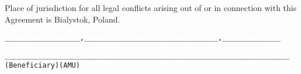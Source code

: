 \A Place of jurisdiction for all legal conflicts arising out of or in
connection with this Agreement is Bialystok, Poland.\\

\vspace{0.2cm}
\begin{alltt}
__________________, ______________    __________________, ______________




__________________________________    __________________________________
           (Beneficiary)                         (AMU)
\end{alltt}


